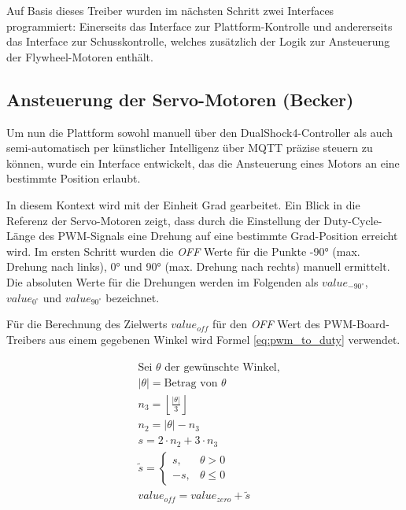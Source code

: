 Auf Basis dieses Treiber wurden im nächsten Schritt zwei Interfaces programmiert: 
Einerseits das Interface zur Plattform-Kontrolle und andererseits das Interface zur Schusskontrolle, welches zusätzlich der Logik zur Ansteuerung der Flywheel-Motoren enthält.

\subsection{Ansteuerung der Servo-Motoren (Becker)}

Um nun die Plattform sowohl manuell über den DualShock4-Controller als auch semi-automatisch per künstlicher Intelligenz über MQTT präzise steuern zu können, wurde ein Interface entwickelt, das die Ansteuerung eines Motors an eine bestimmte Position erlaubt. 

In diesem Kontext wird mit der Einheit Grad gearbeitet. 
Ein Blick in die Referenz \cite{esp_servo_control} der Servo-Motoren zeigt, dass durch die Einstellung der Duty-Cycle-Länge des PWM-Signals eine Drehung auf eine bestimmte Grad-Position erreicht wird. 
Im ersten Schritt wurden die \textit{OFF} Werte für die Punkte \ang{-90} (max. Drehung nach links), \ang{0} und \ang{90} (max. Drehung nach rechts) manuell ermittelt.
Die absoluten Werte für die Drehungen werden im Folgenden als $value_{-90^\circ}$, $value_{0^\circ}$ und $value_{90^\circ}$ bezeichnet.

Für die Berechnung des Zielwerts $value_{off}$ für den \textit{OFF} Wert des PWM-Board-Treibers aus einem gegebenen Winkel wird Formel \ref{eq:pwm_to_duty} verwendet.

\begin{gather}
    \begin{aligned}
    &\text{Sei } \theta \text{ der gewünschte Winkel,} \\
    &|\theta| = \text{Betrag von } \theta \\
    &n_3 = \left\lfloor \frac{|\theta|}{3} \right\rfloor \\
    &n_2 = |\theta| - n_3 \\
    &s = 2 \cdot n_2 + 3 \cdot n_3 \\
    &\tilde{s} =
    \begin{cases}
    s, & \theta > 0 \\
    -s, & \theta \leq 0
    \end{cases} \\
    &value_{off} = value_{zero} + \tilde{s}
    \end{aligned}
    \label{eq:pwm_to_duty}
\end{gather}

